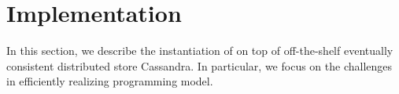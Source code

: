 \section{Implementation}

In this section, we describe the instantiation of \name on top of off-the-shelf
eventually consistent distributed store Cassandra. In particular, we focus on
the challenges in efficiently realizing \name programming model.
